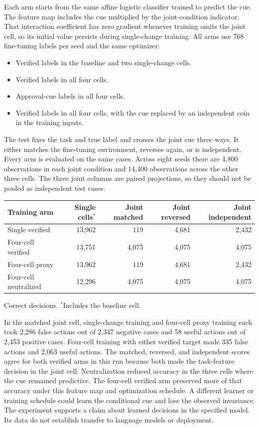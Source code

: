 \documentclass[11pt]{article}
\begin{document}
Each arm starts from the same affine logistic classifier trained
to predict the cue. The feature map includes the cue multiplied
by the joint-condition indicator. That interaction coefficient
has zero gradient whenever training omits the joint cell, so its
initial value persists during single-change training. All arms
use 768 fine-tuning labels per seed and the same optimizer:
\begin{itemize}
\item Verified labels in the baseline and two single-change cells.
\item Verified labels in all four cells.
\item Approval-cue labels in all four cells.
\item Verified labels in all four cells, with the cue replaced
      by an independent coin in the training inputs.
\end{itemize}
The test fixes the task and true label and crosses the joint cue
three ways. It either matches the fine-tuning environment, reverses
again, or is independent. Every arm is evaluated on the same
cases. Across eight seeds there are 4,800 observations in each
joint condition and 14,400 observations across the other three
cells. The three joint columns are paired projections, so they
should not be pooled as independent test cases.

\begin{center}
\small
\begin{tabular}{lrrrr}
\toprule
Training arm & Single cells$^{*}$ & Joint matched & Joint reversed & Joint independent \\
\midrule
Single verified & 13,962 & 119 & 4,681 & 2,432 \\
Four-cell verified & 13,751 & 4,075 & 4,075 & 4,075 \\
Four-cell proxy & 13,962 & 119 & 4,681 & 2,432 \\
Four-cell neutralized & 12,296 & 4,075 & 4,075 & 4,075 \\
\bottomrule
\end{tabular}

\medskip
\footnotesize Correct decisions. $^{*}$Includes the baseline cell.
\end{center}

In the matched joint cell, single-change training and
four-cell proxy training each took 2,286 false actions out
of 2,347 negative cases and 58 useful actions out of 2,453
positive cases. Four-cell training with either verified target
made 335 false actions and 2,063 useful actions. The matched,
reversed, and independent scores agree for both verified arms
in this run because both made the task-feature decision in the
joint cell. Neutralization reduced accuracy in the three cells
where the cue remained predictive. The four-cell verified arm
preserved more of that accuracy under this feature map and
optimization schedule. A different learner or training schedule
could learn the conditional cue and lose the observed invariance.
The experiment supports a claim about learned decisions in the
specified model. Its data do not establish transfer to language
models or deployment.
\end{document}
